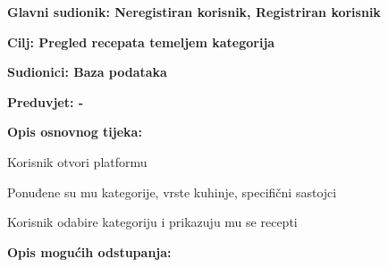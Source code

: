 					\noindent {}
					\begin{packed_item}
						
						\item \textbf{Glavni sudionik: Neregistiran korisnik, Registriran korisnik}
						\item  \textbf{Cilj: Pregled recepata temeljem kategorija} 
						\item  \textbf{Sudionici: Baza podataka} 
						\item  \textbf{Preduvjet: -} 
						\item  \textbf{Opis osnovnog tijeka:}
						
						\item[] \begin{packed_enum}
							
							\item Korisnik otvori platformu
							\item Ponuđene su mu kategorije, vrste kuhinje, specifični sastojci
							\item Korisnik odabire kategoriju i prikazuju mu se recepti
						\end{packed_enum}
						
						\item  \textbf{Opis mogućih odstupanja:}
						
						\item[] \begin{packed_item}
							
							\item[2.a] 
							\item[] \begin{packed_enum}
								
								\item 
								\item
								
							\end{packed_enum}
							\item[2.b] 
							\item[3.a] 
							
						\end{packed_item}
					\end{packed_item}
					
